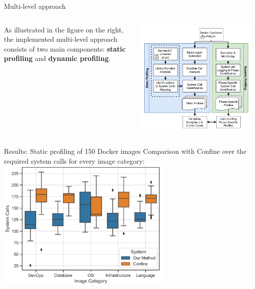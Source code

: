 \documentclass{beamer}
\begin{document}
\begin{frame}{Multi-level approach}
\begin{columns}
\begin{column}{0.5\textwidth}
As illustrated in the figure on the right, the implemented multi-level approach consists of two main components: \textbf{static profiling} and \textbf{dynamic profiling}.
\end{column}
\begin{column}{0.5\textwidth}
\includegraphics[width=1\textwidth]
{assets/SPEAKER/SPEAKER-design.PNG}
\end{column}
\end{columns}
\end{frame}

\begin{frame}{Results: Static profiling of 150 Docker images}
Comparison with Confine over the required system calls for every image category:
\hspace*{2.3cm}
\includegraphics[width=0.65\textwidth]
{assets/SPEAKER/Confine-vs-SPEAKER.PNG}
\end{frame}
\end{document}
